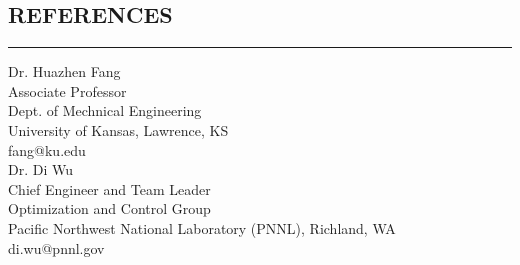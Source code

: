 \documentclass[10pt,letter]{article}
\begin{document}
\begin{small}



\vspace{0.1cm}


\subsection*{REFERENCES}
\hrule


\begin{footnotesize}

\begin{multicols}{2} 
\noindent 
Dr. Huazhen Fang \\
Associate Professor \\
Dept. of Mechnical Engineering \\
University of Kansas, Lawrence, KS \\
fang@ku.edu \\

\noindent
Dr. Di Wu\\
Chief Engineer and Team Leader \\
Optimization and Control Group \\
Pacific Northwest National Laboratory (PNNL), Richland, WA \\
di.wu@pnnl.gov \\


\end{multicols}
\end{footnotesize}
\end{small}
\end{document}
